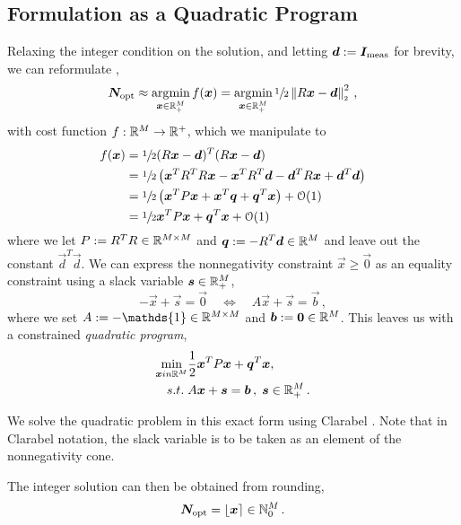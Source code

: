 \subsection{Formulation as a Quadratic Program}
Relaxing the integer condition on the solution, and letting $\vec{d} := \vec{I}_{\rm meas}$ for brevity, we can reformulate ,
$$\vec{N}_{\rm opt} \approx \argmin_{\vec{x} \in \R_+^M} f(\vec{x}) = \argmin_{\vec{x} \in \R_+^M} \sfrac{1}{2} \norm{R \vec{x} - \vec{d}}^2\,,$$
with cost function $f: \R^M \to \R^+$, which we manipulate to
\begin{align*}
  f(\vec{x}) & = \sfrac{1}{2} (R \vec{x} - \vec{d})^T (R \vec{x} - \vec{d})                                                          \\
             & = \sfrac{1}{2} \left(\vec{x}^T R^T R \vec{x} - \vec{x}^T R^T \vec{d} - \vec{d}^T R \vec{x} + \vec{d}^T \vec{d}\right) \\
             & = \sfrac{1}{2} \left(\vec{x}^T P \vec{x} + \vec{x}^T \vec{q} + \vec{q}^T \vec{x}\right) + \mathcal{O}(1)              \\
             & = \sfrac{1}{2} \vec{x}^T P \vec{x} + \vec{q}^T \vec{x} + \mathcal{O}(1)
\end{align*}
where we let $P := R^T R \in \R^{M \times M}$ and $\vec{q} := -R^T \vec{d} \in \R^M$ and leave out the constant $\vec{d}^T \vec{d}$.
We can express the nonnegativity constraint $\vec{x} \ge \vec{0}$ as an equality constraint using a slack variable $\vec{s} \in \R_+^M$,
$$-\vec{x} + \vec{s} = \vec{0} \quad\Leftrightarrow\quad A \vec{x} + \vec{s} = \vec{b}\,,$$
where we set $A := -\mathds{1} \in \R^{M \times M}$ and $\vec{b} := \vec{0} \in \R^M$.
This leaves us with a constrained \textit{quadratic program},
\begin{align}
  \min_{\vec{x} in \R^M} & \frac{1}{2} \vec{x}^T P \vec{x} + \vec{q}^T \vec{x},     \\
  s.t.\;                 & A \vec{x} + \vec{s} = \vec{b}\,,\; \vec{s} \in \R_+^M\,.
\end{align}

We solve the quadratic problem in this exact form using Clarabel \cite{2024-clarabel}.
Note that in Clarabel notation, the slack variable is to be taken as an element of the nonnegativity cone.

The integer solution can then be obtained from rounding,
$$\vec{N}_{\rm opt} = \lfloor \vec{x} \rceil \in \N_0^M\,.$$

